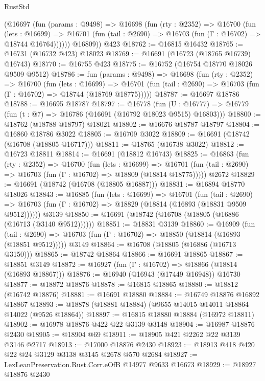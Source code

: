 \begin{lexlean}{RustStd}
\begin{coremodule}
        (@16697
          (fun (params : @9498) =>
          @16698
            (fun (rty : @2352) =>
            @16700
              (fun (lets : @16699) =>
              @16701 (fun (tail : @2690) => @16703 (fun (Γ : @16702) => @18744 @16764))))))
        @16809))
    @423
@18762 := @16815 @16432
@18765 := @16731 (@16732 @423) @18023
@18769 := @16691 (@16723 (@18765 @16739) @16743)
@18770 := @16755 @423
@18775 := @16752 (@16754 @18770 @18026 @9509 @9512)
@18786 := fun (params : @9498) =>
  @16698
    (fun (rty : @2352) =>
    @16700
      (fun (lets : @16699) =>
      @16701 (fun (tail : @2690) => @16703 (fun (Γ : @16702) => @18744 (@18769 @18775)))))
@18787 := @16697 @18786
@18788 := @16695 @18787
@18797 := @16778
    (fun (U : @16777) => @16779 (fun (t : @7) => @16786 (@16691 (@16792 @18023 @9515) @16803)))
@18800 := @18762 (@18788 @18797) @18021
@18802 := @16676 @18787 @18797
@18804 := @16860 @18786 @3022
@18805 := @16709 @3022
@18809 := @16691 (@18742 (@16708 (@18805 @16717)))
@18811 := @18765 (@16738 @3022)
@18812 := @16723 @18811
@18814 := @16691 (@18812 @16743)
@18825 := @16863
    (fun (rty : @2352) =>
    @16700
      (fun (lets : @16699) =>
      @16701 (fun (tail : @2690) => @16703 (fun (Γ : @16702) => @18809 (@18814 @18775)))))
    @2672
@18829 := @16691 (@18742 (@16708 (@18805 @16887)))
@18831 := @16894 @18770 @18026
@18843 := @16885
    (fun (lets : @16699) =>
    @16701
      (fun (tail : @2690) =>
      @16703 (fun (Γ : @16702) => @18829 (@18814 (@16893 (@18831 @9509 @9512))))))
    @3139
@18850 := @16691 (@18742 (@16708 (@18805 (@16886 (@16713 (@3140 @9512))))))
@18851 := @18831 @3139
@18860 := @16909
    (fun (tail : @2690) => @16703 (fun (Γ : @16702) => @18850 (@18814 (@16893 (@18851 @9512)))))
    @3149
@18864 := @16708 (@18805 (@16886 (@16713 @3150)))
@18865 := @18742 @18864
@18866 := @16691 @18865
@18867 := @18851 @3149
@18872 := @16927 (fun (Γ : @16702) => @18866 (@18814 (@16893 @18867)))
@18876 := @16940 (@16943 (@17449 @16948)) @16730
@18877 := @18872 @18876
@18878 := @16815 @18865
@18880 := @18812 (@16742 @18876)
@18881 := @16691 @18880
@18884 := @16749 @18876 @16892 @18867
@18893 := @18878 (@18881 @18884) (@9655 @14015 @14011 @18864 @14022 (@9526 @18864))
@18897 := @16815 @18880 @18884 (@16972 @18811)
@18902 := @16978 @18876 @422 @22 @3139 @3148
@18904 := @16987 @18876 @2430
@18905 := @18904 @69
@18911 := @18905 @421 @2262 @22 @3139 @3146 @2717
@18913 := @17000 @18876 @2430
@18923 := @18913 @418 @420 @22 @24 @3129 @3138 @3145 @2678 @570 @2684
@18927 := LexLeanPreservation.Rust.Corr.eOfB @14977 @9633 @16673
@18929 := @18927 @18876 @2430

\end{coremodule}
\end{lexlean}
